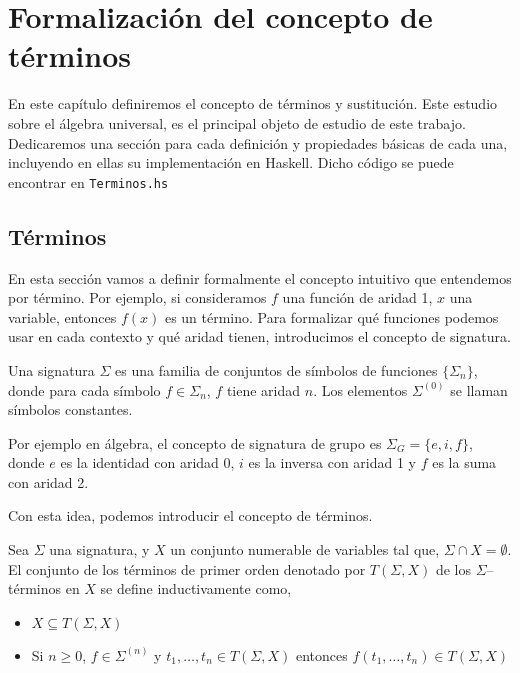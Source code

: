 \chapter{Formalización del concepto de términos}

En este capítulo definiremos el concepto de términos y
sustitución. Este estudio sobre el álgebra universal, es el principal
objeto de estudio de este trabajo. Dedicaremos una sección para cada
definición y propiedades básicas de cada una, incluyendo en ellas su
implementación en Haskell. Dicho código se puede encontrar en
\texttt{Terminos.hs}

\section{Términos}

En esta sección vamos a definir formalmente el concepto intuitivo que
entendemos por término. Por ejemplo, si consideramos $f$ una función de aridad
1, $x$ una variable, entonces $f(x)$ es un término. Para formalizar qué
funciones podemos usar en cada contexto y qué aridad tienen, introducimos el
concepto de signatura.

\begin{defi} 
  Una signatura $\Sigma$ es una familia de conjuntos de símbolos de
  funciones $\{ \Sigma_n \}$, donde para cada símbolo
  $f \in \Sigma_n$, $f$ tiene aridad $n$. Los elementos $\Sigma^{(0)}$
  se llaman símbolos constantes.
\end{defi}

Por ejemplo en álgebra, el concepto de signatura de grupo
es $\Sigma_G = \{e,i,f\}$, donde $e$ es la identidad con aridad 0,
$i$ es la inversa con aridad 1 y $f$ es la suma con aridad 2.

Con esta idea, podemos introducir el concepto de términos.

\begin{defi}
  Sea $\Sigma$ una signatura, y $X$ un conjunto numerable de variables
  tal que, $\Sigma \cap X = \emptyset$. El conjunto de los términos de
  primer orden denotado por $T(\Sigma,X)$ de los $\Sigma$--términos en
  $X$ se define inductivamente como,
  \begin{itemize}
  \item $X \subseteq T(\Sigma,X)$
  \item Si $n \geq 0$, $f \in \Sigma^{(n)}$ y $t_1, \dots, t_n \in
    T(\Sigma, X)$ entonces $f(t_1, \dots, t_n) \in T(\Sigma,X)$ 
  \end{itemize}
\end{defi}

